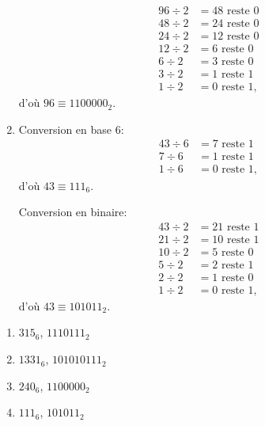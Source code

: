 \begin{exercice}
\begin{sol}
\begin{enumerate}
\begin{minipage}[t]{0.48\linewidth}
\begin{align*}
          96 \div 2 &= 48 \text{ reste } 0 \\
          48 \div 2 &= 24 \text{ reste } 0 \\
          24 \div 2 &= 12 \text{ reste } 0 \\
          12 \div 2 &= 6 \text{ reste } 0 \\
           6 \div 2 &= 3 \text{ reste } 0 \\
           3 \div 2 &= 1 \text{ reste } 1 \\
           1 \div 2 &= 0 \text{ reste } 1,
        \end{align*}
        d'où $96 \equiv 1100000_2$.
      \end{minipage}
    \item
      \begin{minipage}[t]{0.48\linewidth}
        Conversion en base 6:
        \begin{align*}
          43 \div 6 &= 7 \text{ reste } 1 \\
           7 \div 6 &= 1 \text{ reste } 1 \\
           1 \div 6 &= 0 \text{ reste } 1,
        \end{align*}
        d'où $43 \equiv 111_6$.
      \end{minipage}
      \hfill
      \begin{minipage}[t]{0.48\linewidth}
        Conversion en binaire:
        \begin{align*}
          43 \div 2 &= 21 \text{ reste } 1 \\
          21 \div 2 &= 10 \text{ reste } 1 \\
          10 \div 2 &= 5 \text{ reste } 0 \\
           5 \div 2 &= 2 \text{ reste } 1 \\
           2 \div 2 &= 1 \text{ reste } 0 \\
           1 \div 2 &= 0 \text{ reste } 1,
        \end{align*}
        d'où $43 \equiv 101011_2$.
      \end{minipage}
    \end{enumerate}
  \end{sol}
  \begin{rep}
    \begin{enumerate}
    \item $315_6$, $1110111_2$
    \item $1331_6$, $101010111_2$
    \item $240_6$, $1100000_2$
    \item $111_6$, $101011_2$
    \end{enumerate}
  \end{rep}
\end{exercice}

